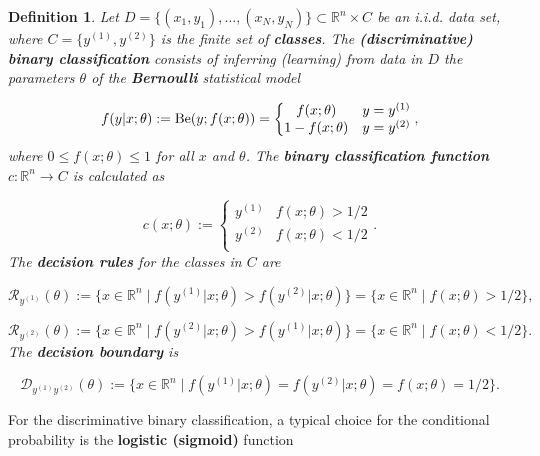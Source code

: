 \documentclass{report}
\newtheorem{definition}{Definition}[chapter]
\begin{document}
\begin{definition}
Let $D = \{(x_1,y_1),\dots,(x_N,y_N)\} \subset \mathbb{R}^n \times C$ be an i.i.d. data set, where $C = \{y^{(1)}, y^{(2)}\}$ is the finite set of \textbf{classes}. The \textbf{(discriminative) binary classification} consists of inferring (learning) from data in $D$ the parameters $\theta$ of the \textbf{Bernoulli} statistical model

\begin{equation}
f(y|x;\theta) := \textup{Be}(y;f(x;\theta)) = \left\{\begin{matrix}
f(x;\theta) & y=y^{(1)}\\
1 - f(x;\theta) & y = y^{(2)} \\
\end{matrix}\right.,
\end{equation}
where $0 \leq f(x;\theta) \leq 1$ for all $x$ and $\theta$. The \textbf{binary classification function} $c : \mathbb{R}^n \to C$ is calculated as

\begin{equation}
c(x;\theta) := \left\{\begin{matrix}
y^{(1)} & f(x;\theta) > 1/2\\
y^{(2)} & f(x;\theta) < 1/2\\
\end{matrix}\right..
\end{equation}
The \textbf{decision rules} for the classes in $C$ are

\begin{equation}
\mathcal{R}_{y^{(1)}}(\theta) := \{x \in \mathbb{R}^n \mid f(y^{(1)}|x;\theta) > f(y^{(2)}|x;\theta)\} = \{x \in \mathbb{R}^n \mid f(x;\theta) > 1/2\},
\end{equation}

\begin{equation}
\mathcal{R}_{y^{(2)}}(\theta) := \{x \in \mathbb{R}^n \mid f(y^{(2)}|x;\theta) > f(y^{(1)}|x;\theta)\} = \{x \in \mathbb{R}^n \mid f(x;\theta) < 1/2\}.
\end{equation}
The \textbf{decision boundary} is

\begin{equation}
\mathcal{D}_{y^{(1)}y^{(2)}}(\theta) := \{x \in \mathbb{R}^n \mid f(y^{(1)}|x;\theta) = f(y^{(2)}|x;\theta) = f(x;\theta) = 1/2\}.
\end{equation}
\end{definition}
For the discriminative binary classification, a typical choice for the conditional probability is the \textbf{logistic (sigmoid)} function
\end{document}
